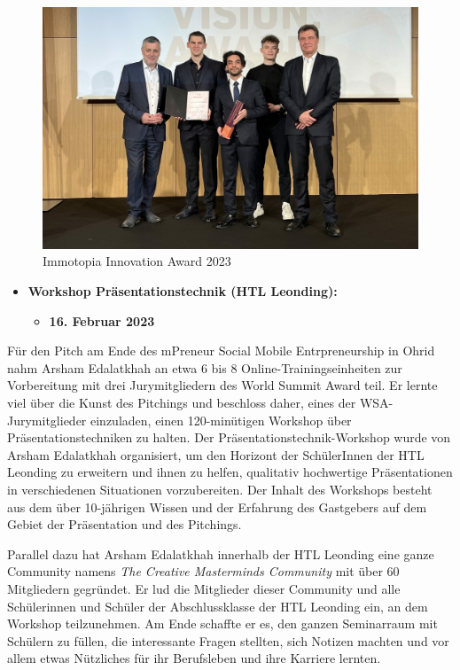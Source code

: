 \begin{figure}[H]
    \centering
    \includegraphics[width=1\textwidth]{pics/Immotopia-2023.jpg}
    \caption{Immotopia Innovation Award 2023}
    \label{fig:Immotopia2023}
\end{figure}

\begin{itemize}
    \item \textbf{Workshop Präsentationstechnik (HTL Leonding):}
          \begin{itemize}
              \item \textbf{16. Februar 2023}
          \end{itemize}
\end{itemize}


Für den Pitch am Ende des mPreneur Social Mobile Entrpreneurship in Ohrid nahm Arsham Edalatkhah an etwa 6 bis 8 Online-Trainingseinheiten zur Vorbereitung mit drei Jurymitgliedern des World Summit Award teil. Er lernte viel über die Kunst des Pitchings und beschloss daher, eines der WSA-Jurymitglieder einzuladen, einen 120-minütigen Workshop über Präsentationstechniken zu halten. Der Präsentationstechnik-Workshop wurde von Arsham Edalatkhah organisiert, um den Horizont der SchülerInnen der HTL Leonding zu erweitern und ihnen zu helfen, qualitativ hochwertige Präsentationen in verschiedenen Situationen vorzubereiten. Der Inhalt des Workshops besteht aus dem über 10-jährigen Wissen und der Erfahrung des Gastgebers auf dem Gebiet der Präsentation und des Pitchings.

Parallel dazu hat Arsham Edalatkhah innerhalb der HTL Leonding eine ganze Community namens \textit{The Creative Masterminds Community} mit über 60 Mitgliedern gegründet. Er lud die Mitglieder dieser Community und alle Schülerinnen und Schüler der Abschlussklasse der HTL Leonding ein, an dem Workshop teilzunehmen. Am Ende schaffte er es, den ganzen Seminarraum mit Schülern zu füllen, die interessante Fragen stellten, sich Notizen machten und vor allem etwas Nützliches für ihr Berufsleben und ihre Karriere lernten.

